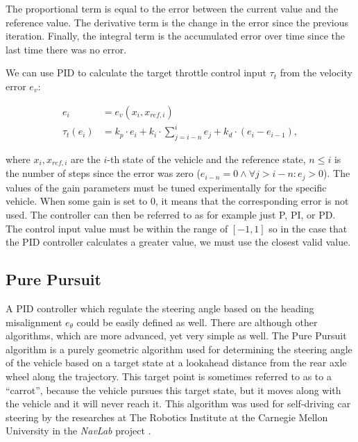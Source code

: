 The proportional term is equal to the error between the current value and the reference value. The derivative term is the change in the error since the previous iteration. Finally, the integral term is the accumulated error over time since the last time there was no error.


We can use \gls*{PID} to calculate the target throttle control input $\tau_t$ from the velocity error $e_v$:

\begin{align*}
	e_i&=e_v(x_i, x_{ref,i}) \\
	\tau_t(e_i)&=k_p \cdot e_i+k_i\cdot\sum_{j=i-n}^{i}e_j + k_d\cdot \left(e_i - e_{i-1}\right),
\end{align*}

where $x_i, x_{ref, i}$ are the  $i$-th state of the vehicle and the reference state, $n\leq i$ is the number of steps since the error was zero ($e_{i-n}=0\land \forall j>i-n: e_j>0$). The values of the gain parameters must be tuned experimentally for the specific vehicle. When some gain is set to $0$, it means that the corresponding error is not used. The controller can then be referred to as for example just P, PI, or PD. The control input value must be within the range of $\left[-1, 1\right]$ so in the case that the \gls*{PID} controller calculates a greater value, we must use the closest valid value. 

\subsection{Pure Pursuit}

A \gls*{PID} controller which regulate the steering angle based on the heading misalignment $e_\theta$ could be easily defined as well. There are although other algorithms, which are more advanced, yet very simple as well. The Pure Pursuit algorithm is a purely geometric algorithm used for determining the steering angle of the vehicle based on a target state at a lookahead distance from the rear axle wheel along the trajectory. This target point is sometimes referred to as to a ``carrot'', because the vehicle pursues this target state, but it moves along with the vehicle and it will never reach it. This algorithm was used for self-driving car steering by the researches at The Robotics Institute at the Carnegie Mellon University in the \textit{NavLab} project \cite{Pure_pursuit}.

